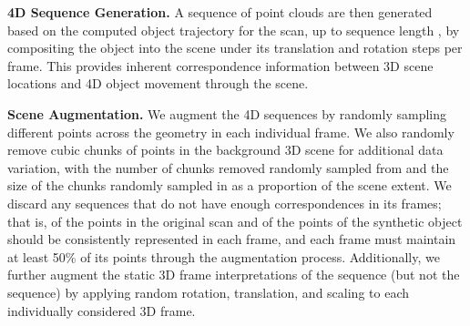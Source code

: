 \documentclass[runningheads]{llncs}
\newcommand{\OURS}{4DContrast}
\begin{document}
\noindent\textbf{4D Sequence Generation.}
A sequence of point clouds are then generated based on the computed object trajectory for the scan, up to sequence length , by  compositing the object into the scene under its translation and rotation steps per frame.
This provides inherent correspondence information between 3D scene locations and 4D object movement through the scene.

\begin{table*}[t]
  \centering
  \caption{Summary of fine-tuning of \OURS{} for various downstream 3D scene understanding tasks and datasets. Our pre-training approach learns effective, transferable features, resulting in notable improvement over  the baseline learning paradigm of training from scratch.
  }
  \vspace{-0.1cm}
\vspace{-0.3cm}
  \label{tab:overall_down}
\end{table*}


\noindent\textbf{Scene Augmentation.} 
We augment the 4D sequences by randomly sampling different points across the geometry in each individual frame.
We also randomly remove cubic chunks of points in the background 3D scene for additional data variation, with the number of chunks removed randomly sampled from  and the size of the chunks randomly sampled in  as a proportion of the scene extent.
We discard any sequences that do not have enough correspondences in its frames; that is,  of the points in the original scan and  of the points of the synthetic object should be consistently represented in each frame, and each frame must maintain at least 50\% of its points through the augmentation process.
Additionally, we further augment the static 3D frame interpretations of the sequence (but not the sequence) by applying random rotation, translation, and scaling to each individually considered 3D frame.
\end{document}
